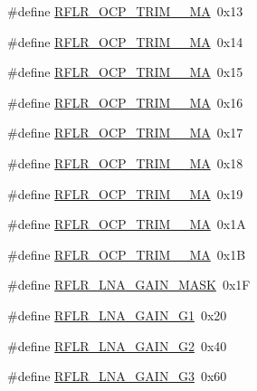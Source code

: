 \begin{DoxyCompactItemize}
\item 
\#define \mbox{\hyperlink{sx1276_regs-_lo_ra_8h_a3755351c3f7f7842a523b6e7627545fe}{R\+F\+L\+R\+\_\+\+O\+C\+P\+\_\+\+T\+R\+I\+M\+\_\+\_\+\+MA}}~0x13
\item 
\#define \mbox{\hyperlink{sx1276_regs-_lo_ra_8h_a13dba4245f8c69fe3dee74ebeaad4ed3}{R\+F\+L\+R\+\_\+\+O\+C\+P\+\_\+\+T\+R\+I\+M\+\_\+\_\+\+MA}}~0x14
\item 
\#define \mbox{\hyperlink{sx1276_regs-_lo_ra_8h_a58209162f626269790dcb91f81340f9d}{R\+F\+L\+R\+\_\+\+O\+C\+P\+\_\+\+T\+R\+I\+M\+\_\+\_\+\+MA}}~0x15
\item 
\#define \mbox{\hyperlink{sx1276_regs-_lo_ra_8h_a27d3cfb3df1cbf0d08af0ba9e57aae49}{R\+F\+L\+R\+\_\+\+O\+C\+P\+\_\+\+T\+R\+I\+M\+\_\+\_\+\+MA}}~0x16
\item 
\#define \mbox{\hyperlink{sx1276_regs-_lo_ra_8h_a1979c11cd7ce8b54355954a9e0139de6}{R\+F\+L\+R\+\_\+\+O\+C\+P\+\_\+\+T\+R\+I\+M\+\_\+\_\+\+MA}}~0x17
\item 
\#define \mbox{\hyperlink{sx1276_regs-_lo_ra_8h_a67bf750125a9cf6cc4137361236ad814}{R\+F\+L\+R\+\_\+\+O\+C\+P\+\_\+\+T\+R\+I\+M\+\_\+\_\+\+MA}}~0x18
\item 
\#define \mbox{\hyperlink{sx1276_regs-_lo_ra_8h_a3c729a06b76ddb3b25279ab9ec9759bf}{R\+F\+L\+R\+\_\+\+O\+C\+P\+\_\+\+T\+R\+I\+M\+\_\+\_\+\+MA}}~0x19
\item 
\#define \mbox{\hyperlink{sx1276_regs-_lo_ra_8h_a62fbdb1632a9ef8e2464a411ba6270ac}{R\+F\+L\+R\+\_\+\+O\+C\+P\+\_\+\+T\+R\+I\+M\+\_\+\_\+\+MA}}~0x1A
\item 
\#define \mbox{\hyperlink{sx1276_regs-_lo_ra_8h_a5b9df1b8ef5dd642212f2da58fff03e3}{R\+F\+L\+R\+\_\+\+O\+C\+P\+\_\+\+T\+R\+I\+M\+\_\+\_\+\+MA}}~0x1B
\item 
\#define \mbox{\hyperlink{sx1276_regs-_lo_ra_8h_adaf87cfb5bc1842f215a8905466c7c09}{R\+F\+L\+R\+\_\+\+L\+N\+A\+\_\+\+G\+A\+I\+N\+\_\+\+M\+A\+SK}}~0x1F
\item 
\#define \mbox{\hyperlink{sx1276_regs-_lo_ra_8h_a037aede58520e0ac15f5b63e9edef4fb}{R\+F\+L\+R\+\_\+\+L\+N\+A\+\_\+\+G\+A\+I\+N\+\_\+\+G1}}~0x20
\item 
\#define \mbox{\hyperlink{sx1276_regs-_lo_ra_8h_a20befb067e09b6a2f3768e8f0da43eec}{R\+F\+L\+R\+\_\+\+L\+N\+A\+\_\+\+G\+A\+I\+N\+\_\+\+G2}}~0x40
\item 
\#define \mbox{\hyperlink{sx1276_regs-_lo_ra_8h_accae2f3f70ca282fd61cb09a667901ba}{R\+F\+L\+R\+\_\+\+L\+N\+A\+\_\+\+G\+A\+I\+N\+\_\+\+G3}}~0x60
\item 

\end{DoxyCompactItemize}
